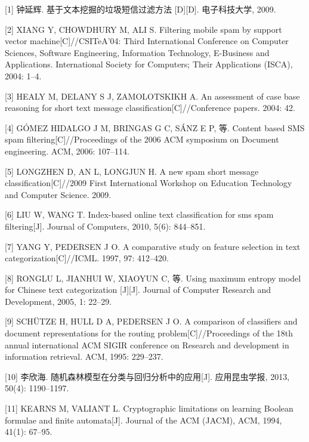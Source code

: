 \hypertarget{refs}{}
\hypertarget{ref-ux949fux5ef6ux8f892009ux57faux4e8eux6587ux672cux6316ux6398ux7684ux5783ux573eux77edux4fe1ux8fc7ux6ee4ux65b9ux6cd5}{}
{[}1{]} 钟延辉. 基于文本挖掘的垃圾短信过滤方法 {[}D{]}{[}D{]}.
电子科技大学, 2009.

\hypertarget{ref-xiang2004filtering}{}
{[}2{]} XIANG Y, CHOWDHURY M, ALI S. Filtering mobile spam by support
vector machine{[}C{]}//CSITeA'04: Third International Conference on
Computer Sciences, Software Engineering, Information Technology,
E-Business and Applications. International Society for Computers; Their
Applications (ISCA), 2004: 1--4.

\hypertarget{ref-healy2004assessment}{}
{[}3{]} HEALY M, DELANY S J, ZAMOLOTSKIKH A. An assessment of case base
reasoning for short text message classification{[}C{]}//Conference
papers. 2004: 42.

\hypertarget{ref-gomez2006content}{}
{[}4{]} GÓMEZ HIDALGO J M, BRINGAS G C, SÁNZ E P, 等. Content based SMS
spam filtering{[}C{]}//Proceedings of the 2006 ACM symposium on Document
engineering. ACM, 2006: 107--114.

\hypertarget{ref-longzhen2009new}{}
{[}5{]} LONGZHEN D, AN L, LONGJUN H. A new spam short message
classification{[}C{]}//2009 First International Workshop on Education
Technology and Computer Science. 2009.

\hypertarget{ref-liu2010index}{}
{[}6{]} LIU W, WANG T. Index-based online text classification for sms
spam filtering{[}J{]}. Journal of Computers, 2010, 5(6): 844--851.

\hypertarget{ref-yang1997comparative}{}
{[}7{]} YANG Y, PEDERSEN J O. A comparative study on feature selection
in text categorization{[}C{]}//ICML. 1997, 97: 412--420.

\hypertarget{ref-ronglu2005using}{}
{[}8{]} RONGLU L, JIANHUI W, XIAOYUN C, 等. Using maximum entropy model
for Chinese text categorization {[}J{]}{[}J{]}. Journal of Computer
Research and Development, 2005, 1: 22--29.

\hypertarget{ref-schutze1995comparison}{}
{[}9{]} SCHÜTZE H, HULL D A, PEDERSEN J O. A comparison of classifiers
and document representations for the routing problem{[}C{]}//Proceedings
of the 18th annual international ACM SIGIR conference on Research and
development in information retrieval. ACM, 1995: 229--237.

\hypertarget{ref-ux674eux6b23ux6d772013ux968fux673aux68eeux6797ux6a21ux578bux5728ux5206ux7c7bux4e0eux56deux5f52ux5206ux6790ux4e2dux7684ux5e94ux7528}{}
{[}10{]} 李欣海. 随机森林模型在分类与回归分析中的应用{[}J{]}.
应用昆虫学报, 2013, 50(4): 1190--1197.

\hypertarget{ref-kearns1994cryptographic}{}
{[}11{]} KEARNS M, VALIANT L. Cryptographic limitations on learning
Boolean formulae and finite automata{[}J{]}. Journal of the ACM (JACM),
ACM, 1994, 41(1): 67--95.
